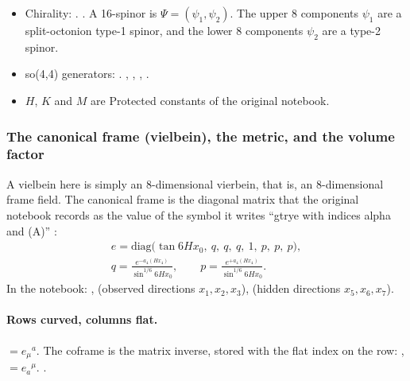 \begin{itemize}
    ,
    ,
    .
  \item Chirality: . 
    .
    A 16-spinor is $\Psi=(\psi_1,\psi_2)$. The upper 8 components $\psi_1$ are a split-octonion
    type-1 spinor, and the lower 8 components $\psi_2$ are a type-2 spinor.
  \item so(4,4) generators: .
     ,
    ,
    ,
    .
  \item $H$, $K$ and $M$ are Protected constants of the original notebook.
\end{itemize}

\subsubsection{The canonical frame (vielbein), the metric, and the volume factor}
\label{csc:frame}\label{sec:3.8.3}

A vielbein here is simply an 8-dimensional vierbein, that is, an 8-dimensional frame field. The
canonical frame is the diagonal matrix that the original notebook records as the value of the
symbol it writes ``gtrye with indices alpha and (A)'' :
\begin{gather}
  e=\mathrm{diag}\bigl(\tan 6Hx_0,\ q,\ q,\ q,\ 1,\ p,\ p,\ p\bigr),\\
  q=\frac{e^{-a_4(Hx_4)}}{\sin^{1/6}6Hx_0},\qquad
  p=\frac{e^{+a_4(Hx_4)}}{\sin^{1/6}6Hx_0}.
\end{gather}
In the notebook: ,
 (observed directions $x_1,x_2,x_3$),  (hidden directions
$x_5,x_6,x_7$).

\paragraph{Rows curved, columns flat.}  $=e_\mu{}^a$. The
coframe is the matrix inverse, stored with the flat index on the row:
, 
$=e_a{}^\mu$. 
.

